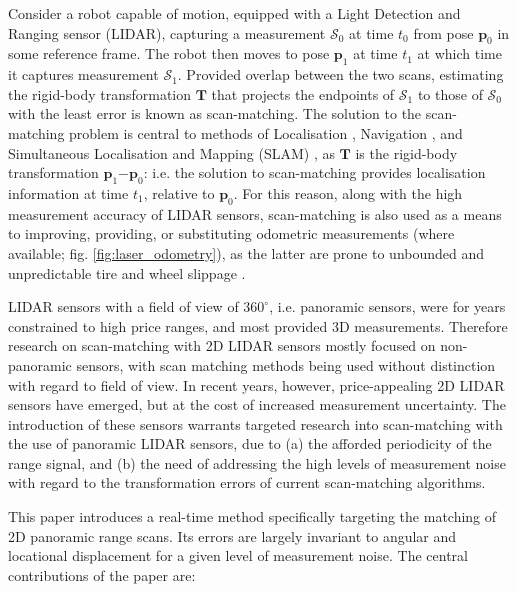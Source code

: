 Consider a robot capable of motion, equipped with a Light Detection and Ranging
sensor (LIDAR), capturing a measurement $\mathcal{S}_0$ at time $t_0$ from pose
$\bm{p}_0$ in some reference frame. The robot then moves to pose $\bm{p}_1$ at
time $t_1$ at which time it captures measurement $\mathcal{S}_1$. Provided
overlap between the two scans, estimating the rigid-body transformation
$\bm{T}$ that projects the endpoints of $\mathcal{S}_1$ to those of
$\mathcal{S}_0$ with the least error is known as scan-matching. The solution to
the scan-matching problem is central to methods of Localisation
\cite{lidar_localisation_1}, Navigation
\cite{lidar_navigation_1}, and Simultaneous
Localisation and Mapping (SLAM) \cite{lidar_slam_4}\cite{lidar_slam_5}, as
$\bm{T}$ is the rigid-body transformation $\bm{p}_1$$-$$\bm{p}_0$: i.e. the
solution to scan-matching provides localisation information at time $t_1$,
relative to $\bm{p}_0$. For this reason, along with the high measurement
accuracy of LIDAR sensors, scan-matching is also used as a means to improving,
providing, or substituting odometric measurements (where available; fig.
\ref{fig:laser_odometry}), as the latter are prone to unbounded and
unpredictable tire and wheel slippage \cite{olson}\cite{lidar_odom_1}.

LIDAR sensors with a field of view of $360^\circ$, i.e. panoramic sensors, were
for years constrained to high price ranges, and most provided 3D measurements.
Therefore research on scan-matching with 2D LIDAR sensors mostly focused on
non-panoramic sensors, with scan matching methods being used without distinction
with regard to field of view. In recent years, however, price-appealing
2D LIDAR sensors have emerged, but at the cost of increased measurement
uncertainty. The introduction of these sensors warrants targeted research
into scan-matching with the use of panoramic LIDAR sensors, due to (a) the
afforded periodicity of the range signal, and (b) the need of
addressing the high levels of measurement noise with regard to the
transformation errors of current scan-matching algorithms.

This paper introduces a real-time method specifically targeting the matching of
2D panoramic range scans. Its errors are largely invariant to angular and
locational displacement for a given level of measurement noise. The central
contributions of the paper are:

